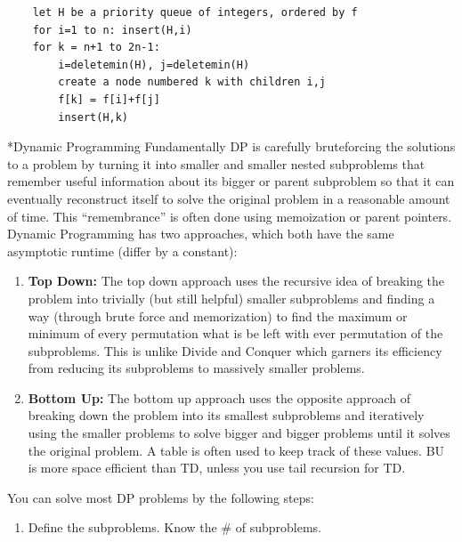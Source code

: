 \documentclass[3pt,landscape]{article}
\makeatletter
\renewcommand{\section}{\@startsection{section}{1}{0mm}{-1ex plus -.5ex minus -.2ex}{0.5ex plus .2ex}{\normalfont\large\bfseries}}
\makeatother
\begin{document}
\begin{multicols}{3}
\begin{verbatim}
    let H be a priority queue of integers, ordered by f
    for i=1 to n: insert(H,i)
    for k = n+1 to 2n-1:
        i=deletemin(H), j=deletemin(H)
        create a node numbered k with children i,j
        f[k] = f[i]+f[j]
        insert(H,k)
\end{verbatim}




\section*{Dynamic Programming}
Fundamentally DP is carefully bruteforcing the solutions to a problem by turning it into smaller and smaller nested subproblems that remember useful information about its bigger or parent subproblem so that it can eventually reconstruct itself to solve the original problem in a reasonable amount of time. This ``remembrance'' is often done using memoization or parent pointers.\\
Dynamic Programming has two approaches, which both have the same asymptotic runtime (differ by a constant):
\begin{enumerate}
\item \textbf{Top Down:}
The top down approach uses the recursive idea of breaking the problem into trivially (but still helpful) smaller subproblems and finding a way (through brute force and memorization) to find the maximum or minimum of every permutation what is be left with ever permutation of the subproblems. This is unlike Divide and Conquer which garners its efficiency from reducing its subproblems to massively smaller problems. 
\item \textbf{Bottom Up:}
The bottom up approach uses the opposite approach of breaking down the problem into its smallest subproblems and iteratively using the smaller problems to solve bigger and bigger problems until it solves the original problem. A table is often used to keep track of these values. BU is more space efficient than TD, unless you use tail recursion for TD.
\end{enumerate} 
You can solve most DP problems by the following steps:
\begin{enumerate}
\item Define the subproblems. Know the \# of subproblems. 

\end{enumerate}
\end{multicols}
\end{document}
